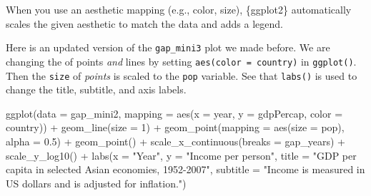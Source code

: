 \documentclass[
  letterpaper,
  DIV=11,
  numbers=noendperiod]{scrreprt}
\newenvironment{Shaded}{\begin{snugshade}}{\end{snugshade}}
\newcommand{\AttributeTok}[1]{\textcolor[rgb]{0.40,0.45,0.13}{#1}}
\newcommand{\DecValTok}[1]{\textcolor[rgb]{0.68,0.00,0.00}{#1}}
\newcommand{\FloatTok}[1]{\textcolor[rgb]{0.68,0.00,0.00}{#1}}
\newcommand{\FunctionTok}[1]{\textcolor[rgb]{0.28,0.35,0.67}{#1}}
\newcommand{\NormalTok}[1]{\textcolor[rgb]{0.00,0.23,0.31}{#1}}
\newcommand{\SpecialCharTok}[1]{\textcolor[rgb]{0.37,0.37,0.37}{#1}}
\newcommand{\StringTok}[1]{\textcolor[rgb]{0.13,0.47,0.30}{#1}}
\begin{document}
\begin{tcolorbox}[enhanced jigsaw, colframe=quarto-callout-note-color-frame, rightrule=.15mm, opacityback=0, breakable, coltitle=black, colbacktitle=quarto-callout-note-color!10!white, bottomrule=.15mm, leftrule=.75mm, toprule=.15mm, arc=.35mm, bottomtitle=1mm, colback=white, left=2mm, opacitybacktitle=0.6, titlerule=0mm, title=\textcolor{quarto-callout-note-color}{\faInfo}\hspace{0.5em}{Challenge}, toptitle=1mm]

When you use an aesthetic mapping (e.g., color, size), \{ggplot2\}
automatically scales the given aesthetic to match the data and adds a
legend.

Here is an updated version of the \texttt{gap\_mini3} plot we made
before. We are changing the of points \emph{and} lines by setting
\texttt{aes(color\ =\ country)} in \texttt{ggplot()}. Then the
\texttt{size} of \emph{points} is scaled to the \texttt{pop} variable.
See that \texttt{labs()} is used to change the title, subtitle, and axis
labels.

\begin{Shaded}
\begin{Highlighting}[]
\FunctionTok{ggplot}\NormalTok{(}\AttributeTok{data =}\NormalTok{ gap\_mini2, }
       \AttributeTok{mapping =} \FunctionTok{aes}\NormalTok{(}\AttributeTok{x =}\NormalTok{ year, }
                     \AttributeTok{y =}\NormalTok{ gdpPercap, }
                     \AttributeTok{color =}\NormalTok{ country)) }\SpecialCharTok{+}
  \FunctionTok{geom\_line}\NormalTok{(}\AttributeTok{size =} \DecValTok{1}\NormalTok{) }\SpecialCharTok{+}
  \FunctionTok{geom\_point}\NormalTok{(}\AttributeTok{mapping =} \FunctionTok{aes}\NormalTok{(}\AttributeTok{size =}\NormalTok{ pop),}
                           \AttributeTok{alpha =} \FloatTok{0.5}\NormalTok{) }\SpecialCharTok{+}
  \FunctionTok{geom\_point}\NormalTok{() }\SpecialCharTok{+}
  \FunctionTok{scale\_x\_continuous}\NormalTok{(}\AttributeTok{breaks =}\NormalTok{ gap\_years) }\SpecialCharTok{+}
  \FunctionTok{scale\_y\_log10}\NormalTok{()  }\SpecialCharTok{+}
  \FunctionTok{labs}\NormalTok{(}\AttributeTok{x =} \StringTok{"Year"}\NormalTok{, }
       \AttributeTok{y =} \StringTok{"Income per person"}\NormalTok{,}
       \AttributeTok{title =} \StringTok{"GDP per capita in selected Asian economies, 1952{-}2007"}\NormalTok{,}
       \AttributeTok{subtitle =} \StringTok{"Income is measured in US dollars and is adjusted for inflation."}\NormalTok{)}
\end{Highlighting}
\end{Shaded}


\end{tcolorbox}
\end{document}
